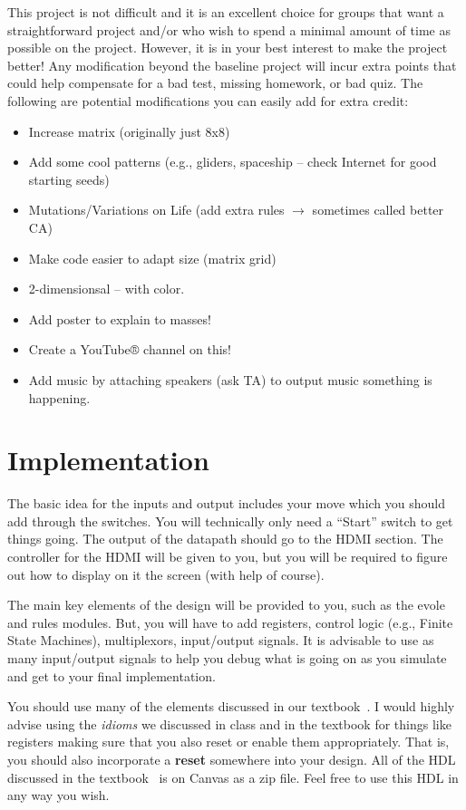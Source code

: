 \documentclass{article}
\begin{document}
This project is not difficult and it is an excellent choice for groups that want a straightforward
project and/or who wish to spend a minimal amount of time as possible on the project. However,
it is in your best interest to make the project better! Any modification beyond the baseline
project will incur extra points that could help compensate for a bad test, missing homework, or
bad quiz. The following are potential modifications you can easily add
for extra credit:
\begin{itemize}
\item Increase matrix (originally just 8x8)
\item Add some cool patterns (e.g., gliders, spaceship – check Internet for good starting seeds)
\item Mutations/Variations on Life (add extra rules $\rightarrow$ sometimes called better CA)
\item Make code easier to adapt size (matrix grid)
\item 2-dimensionsal – with color.
\item Add poster to explain to masses!
\item Create a YouTube® channel on this!
\item Add music by attaching speakers (ask TA) to output music something is
  happening.
\end{itemize}

\section{Implementation}

The basic idea for the inputs and output includes your move which you
should add through the switches.  You will technically only need a
``Start'' switch to get things going.  The output of the datapath
should go to the HDMI section.  The controller for the HDMI will be
given to you, but you will be required to figure out how to display on
it the screen (with help of course).

The main key elements of the design will be provided to you, such as
the evole and rules modules.  But, you will have to add registers,
control logic (e.g., Finite State Machines), multiplexors, input/output signals.
It is advisable to use as many input/output signals to help you debug
what is going on as you simulate and get to your final
implementation.

You should use many of the elements discussed in our
textbook~\cite{ddca-riscv}.  I would highly advise using the
\textit{idioms} we discussed in class 
and in the textbook for things
like registers making sure that you also reset or enable them appropriately.
That is, you should also incorporate a \textbf{reset} somewhere into your
design.  All of the HDL discussed in the textbook~\cite{ddca-riscv} is
on Canvas as a zip file.  Feel free to use this HDL in any way you wish.
\end{document}
